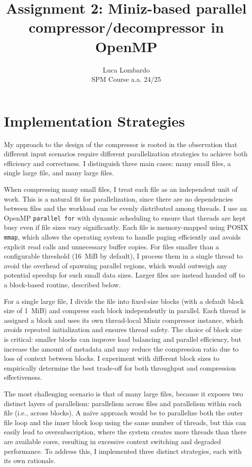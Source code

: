 \documentclass[10pt]{article}
\title{Assignment 2: Miniz-based parallel compressor/decompressor in OpenMP}
\author{Luca Lombardo \\ SPM Course a.a. 24/25}
\date{}
\begin{document}
\maketitle
\vspace{-1.5em}

\section{Implementation Strategies}
My approach to the design of the compressor is rooted in the observation that different input scenarios require different parallelization strategies to achieve both efficiency and correctness. I distinguish three main cases: many small files, a single large file, and many large files.

When compressing many small files, I treat each file as an independent unit of work. This is a natural fit for parallelization, since there are no dependencies between files and the workload can be evenly distributed among threads. I use an OpenMP \texttt{parallel for} with dynamic scheduling to ensure that threads are kept busy even if file sizes vary significantly. Each file is memory-mapped using POSIX \texttt{mmap}, which allows the operating system to handle paging efficiently and avoids explicit read calls and unnecessary buffer copies. For files smaller than a configurable threshold (16~MiB by default), I process them in a single thread to avoid the overhead of spawning parallel regions, which would outweigh any potential speedup for such small data sizes. Larger files are instead handed off to a block-based routine, described below.

For a single large file, I divide the file into fixed-size blocks (with a default block size of 1~MiB) and compress each block independently in parallel. Each thread is assigned a block and uses its own thread-local Miniz compressor instance, which avoids repeated initialization and ensures thread safety. The choice of block size is critical: smaller blocks can improve load balancing and parallel efficiency, but increase the amount of metadata and may reduce the compression ratio due to loss of context between blocks. I experiment with different block sizes to empirically determine the best trade-off for both throughput and compression effectiveness.

The most challenging scenario is that of many large files, because it exposes two distinct layers of parallelism: parallelism across files and parallelism within each file (i.e., across blocks). A naïve approach would be to parallelize both the outer file loop and the inner block loop using the same number of threads, but this can easily lead to oversubscription, where the system creates more threads than there are available cores, resulting in excessive context switching and degraded performance. To address this, I implemented three distinct strategies, each with its own rationale.
\end{document}
